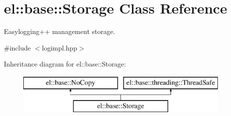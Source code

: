 \hypertarget{classel_1_1base_1_1Storage}{\section{el\-:\-:base\-:\-:Storage Class Reference}
\label{classel_1_1base_1_1Storage}
}


Easylogging++ management storage.  




{\ttfamily \#include $<$logimpl.\-hpp$>$}

Inheritance diagram for el\-:\-:base\-:\-:Storage\-:\begin{figure}[H]
\begin{center}
\leavevmode
\includegraphics[height=2.000000cm]{classel_1_1base_1_1Storage}
\end{center}
\end{figure}

